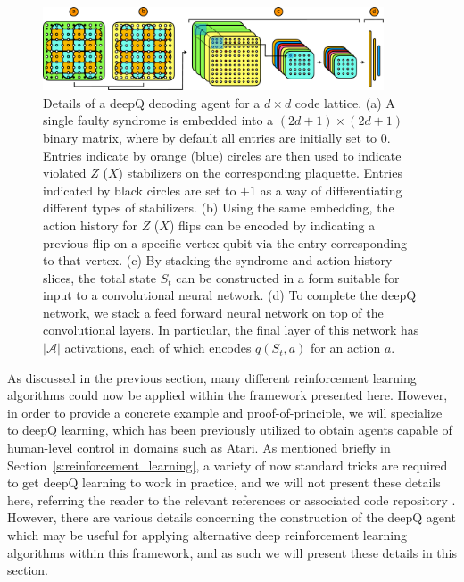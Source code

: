 \documentclass[twocolumn,preprintnumbers,amsmath,amssymb,notitlepage,nofootinbib,longbibliography,superscriptaddress,aps,pra,10pt]{revtex4-1}
\begin{document}
	\begin{figure}
		\centering
		\includegraphics[width=0.9\textwidth]{figures/agent.pdf}
		\caption{
			Details of a deepQ decoding agent for a $d\times d$ code lattice.
			(a) A single faulty syndrome is embedded into a $(2d +1)\times(2d+1)$ binary matrix, where by default all entries are initially set to $0$.
			Entries indicate by orange (blue) circles are then used to indicate violated $Z$ ($X$) stabilizers on the corresponding plaquette.
			Entries indicated by black circles are set to $+1$ as a way of differentiating different types of stabilizers.
			(b) Using the same embedding, the action history for $Z$ ($X$) flips can be encoded by indicating a previous flip on a specific vertex qubit via the entry corresponding to that vertex.
			(c) By stacking the syndrome and action history slices, the total state $S_t$ can be constructed in a form suitable for input to a convolutional neural network.
			(d) To complete the deepQ network, we stack a feed forward neural network on top of the convolutional layers.
			In particular, the final layer of this network has $|\mathcal{A}|$ activations, each of which encodes $q(S_t,a)$ for an action $a$.
		}
		\label{f:agent}
	\end{figure}

	As discussed in the previous section, many different reinforcement learning algorithms could now be applied within the framework presented here. 
	However, in order to provide a concrete example and proof-of-principle, we will specialize to deepQ learning, which has been previously utilized to obtain agents capable of human-level control in domains such as Atari.
	As mentioned briefly in Section~\ref{s:reinforcement_learning}, a variety of now standard tricks are required to get deepQ learning to work in practice, and we will not present these details here, referring the reader to the relevant references \cite{RLMnih15,RLvan2016deep,RLschaul2015prioritized,RLwang2015dueling} or associated code repository \cite{DeepQDecoding}.
	However, there are various details concerning the construction of the deepQ agent which may be useful for applying alternative deep reinforcement learning algorithms within this framework, and as such we will present these details in this section.
\end{document}
